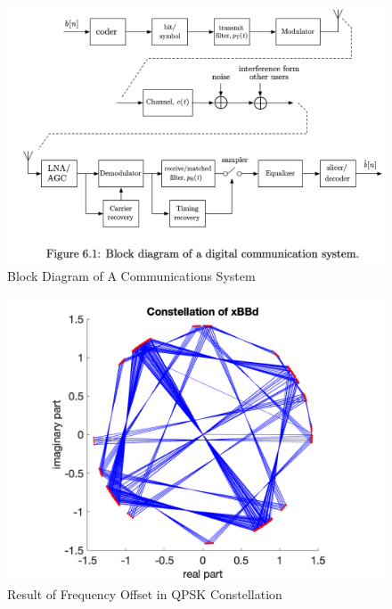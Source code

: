 \begin{figure}[h!]
    \centering
    \includegraphics[scale=0.7]{figures/software_radio_system.png}
    \caption{Block Diagram of A Communications System}
    \label{fig:comm-system}
\end{figure}
\begin{figure}[h!]
    \centering
    \includegraphics[scale=0.5]{figures/constellation_rotation.png}
    \caption{Result of Frequency Offset in QPSK Constellation}
    \label{fig:qpsk-rotate}
\end{figure}
